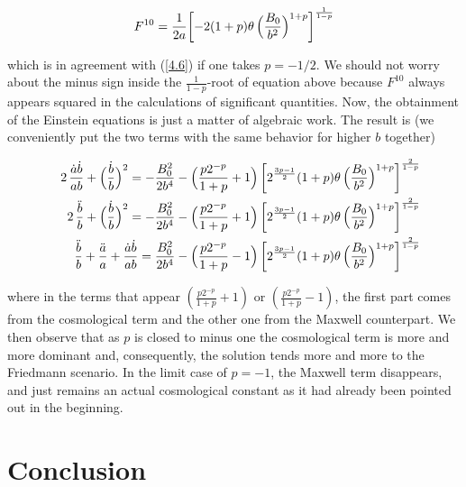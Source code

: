 \documentclass[a4paper,twocolumn,prd,superscriptaddress,nofootinbib,showpacs]
{revtex4}
\begin{document}
\begin{equation}
F^{10}=\frac{1}{2a}\biggl[-2(1+p)\theta\,
\Bigl(\frac{B_0}{b^2}\Bigr)^{1+p}\biggr]^\frac{1}{1-p}
\label{4.10}
\end{equation}

\noindent
which is in agreement with (\ref{4.6}) if one takes $p=-1/2$. We
should not worry about the minus sign inside the $\frac{1}{1-p}$-root
of equation above because $F^{10}$ always appears squared in the
calculations of significant quantities. Now, the obtainment of the
Einstein equations is just a matter of algebraic work. The result is
(we conveniently put the two terms with the same behavior for higher
$b$ together)

\begin{widetext}

\begin{eqnarray}
&&2\,\frac{\dot a\dot b}{ab}
+\Bigl(\frac{\dot b}{b}\Bigr)^2
=-\frac{B_0^2}{2b^4}
-\Bigl(\frac{p2^{-p}}{1+p}+1\Bigr)\,
\biggl[2^\frac{3p-1}{2}(1+p)\theta\,
\Bigl(\frac{B_0}{b^2}\Bigr)^{1+p}\biggr]^\frac{2}{1-p}
\label{4.11}\\
&&2\,\frac{\ddot b}{b}
+\Bigl(\frac{\dot b}{b}\Bigr)^2
=-\frac{B_0^2}{2b^4}
-\Bigl(\frac{p2^{-p}}{1+p}+1\Bigr)\,
\biggl[2^\frac{3p-1}{2}(1+p)\theta\,
\Bigl(\frac{B_0}{b^2}\Bigr)^{1+p}\biggr]^\frac{2}{1-p}
\label{4.12}\\
&&\frac{\ddot b}{b}+\frac{\ddot a}{a}+\frac{\dot a\dot b}{ab}
=\frac{B_0^2}{2b^4}
-\Bigl(\frac{p2^{-p}}{1+p}-1\Bigr)\,
\biggl[2^\frac{3p-1}{2}(1+p)\theta\,
\Bigl(\frac{B_0}{b^2}\Bigr)^{1+p}\biggr]^\frac{2}{1-p}
\label{4.13}\\
\end{eqnarray}

\end{widetext}

\noindent
where in the terms that appear $(\frac{p2^{-p}}{1+p}+1)$ or
$(\frac{p2^{-p}}{1+p}-1)$, the first part comes from the cosmological
term and the other one from the Maxwell counterpart. We then observe
that as $p$ is closed to minus one the cosmological term is more and
more dominant and, consequently, the solution tends more and more to
the Friedmann scenario. In the limit case of $p=-1$, the Maxwell term
disappears, and just remains an actual cosmological constant as it had
already been pointed out in the beginning.

\section{Conclusion}
\end{document}
